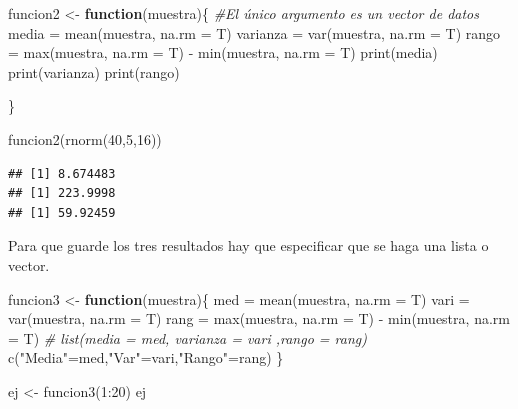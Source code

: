 \documentclass[
]{book}
\newenvironment{Shaded}{\begin{snugshade}}{\end{snugshade}}
\newcommand{\AttributeTok}[1]{\textcolor[rgb]{0.77,0.63,0.00}{#1}}
\newcommand{\CommentTok}[1]{\textcolor[rgb]{0.56,0.35,0.01}{\textit{#1}}}
\newcommand{\ControlFlowTok}[1]{\textcolor[rgb]{0.13,0.29,0.53}{\textbf{#1}}}
\newcommand{\DecValTok}[1]{\textcolor[rgb]{0.00,0.00,0.81}{#1}}
\newcommand{\FunctionTok}[1]{\textcolor[rgb]{0.00,0.00,0.00}{#1}}
\newcommand{\NormalTok}[1]{#1}
\newcommand{\OtherTok}[1]{\textcolor[rgb]{0.56,0.35,0.01}{#1}}
\newcommand{\SpecialCharTok}[1]{\textcolor[rgb]{0.00,0.00,0.00}{#1}}
\newcommand{\StringTok}[1]{\textcolor[rgb]{0.31,0.60,0.02}{#1}}
\begin{document}
\begin{Shaded}
\begin{Highlighting}[]
\NormalTok{funcion2 }\OtherTok{\textless{}{-}} \ControlFlowTok{function}\NormalTok{(muestra)\{     }\CommentTok{\#El único argumento es un vector de datos}
\NormalTok{  media }\OtherTok{=} \FunctionTok{mean}\NormalTok{(muestra, }\AttributeTok{na.rm =}\NormalTok{ T)}
\NormalTok{  varianza }\OtherTok{=} \FunctionTok{var}\NormalTok{(muestra, }\AttributeTok{na.rm =}\NormalTok{ T)}
\NormalTok{  rango }\OtherTok{=} \FunctionTok{max}\NormalTok{(muestra, }\AttributeTok{na.rm =}\NormalTok{ T) }\SpecialCharTok{{-}} \FunctionTok{min}\NormalTok{(muestra, }\AttributeTok{na.rm =}\NormalTok{ T)}
  \FunctionTok{print}\NormalTok{(media)}
  \FunctionTok{print}\NormalTok{(varianza)}
  \FunctionTok{print}\NormalTok{(rango)}

\NormalTok{\}}

\FunctionTok{funcion2}\NormalTok{(}\FunctionTok{rnorm}\NormalTok{(}\DecValTok{40}\NormalTok{,}\DecValTok{5}\NormalTok{,}\DecValTok{16}\NormalTok{))}
\end{Highlighting}
\end{Shaded}

\begin{verbatim}
## [1] 8.674483
## [1] 223.9998
## [1] 59.92459
\end{verbatim}

Para que guarde los tres resultados hay que especificar que se haga una lista o vector.

\begin{Shaded}
\begin{Highlighting}[]
\NormalTok{funcion3 }\OtherTok{\textless{}{-}} \ControlFlowTok{function}\NormalTok{(muestra)\{     }
\NormalTok{  med }\OtherTok{=} \FunctionTok{mean}\NormalTok{(muestra, }\AttributeTok{na.rm =}\NormalTok{ T)}
\NormalTok{  vari }\OtherTok{=} \FunctionTok{var}\NormalTok{(muestra, }\AttributeTok{na.rm =}\NormalTok{ T)}
\NormalTok{  rang }\OtherTok{=} \FunctionTok{max}\NormalTok{(muestra, }\AttributeTok{na.rm =}\NormalTok{ T) }\SpecialCharTok{{-}} \FunctionTok{min}\NormalTok{(muestra, }\AttributeTok{na.rm =}\NormalTok{ T)}
  \CommentTok{\# list(media = med, varianza = vari ,rango = rang)}
  \FunctionTok{c}\NormalTok{(}\StringTok{"Media"}\OtherTok{=}\NormalTok{med,}\StringTok{"Var"}\OtherTok{=}\NormalTok{vari,}\StringTok{"Rango"}\OtherTok{=}\NormalTok{rang)}
\NormalTok{\}}

\NormalTok{ej }\OtherTok{\textless{}{-}} \FunctionTok{funcion3}\NormalTok{(}\DecValTok{1}\SpecialCharTok{:}\DecValTok{20}\NormalTok{)}
\NormalTok{ej}
\end{Highlighting}
\end{Shaded}
\end{document}
